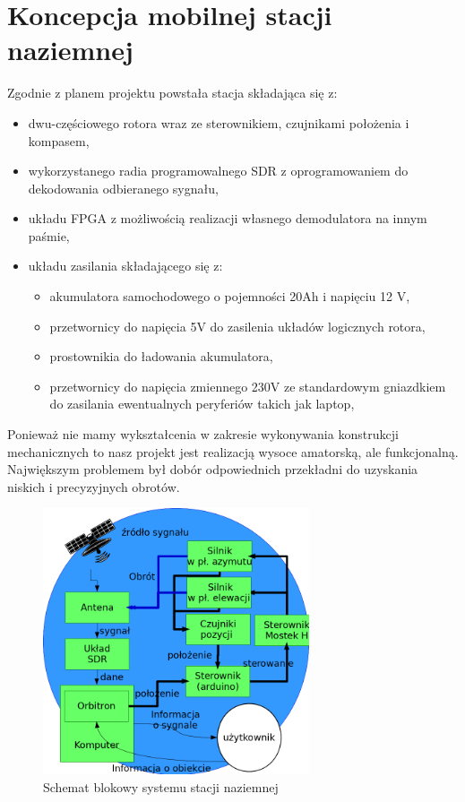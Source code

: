 \section{Koncepcja mobilnej stacji naziemnej}

Zgodnie z planem projektu powstała stacja składająca się z:

\begin{itemize}
 \item dwu-częściowego rotora wraz ze sterownikiem, czujnikami położenia i kompasem,
 \item wykorzystanego radia programowalnego SDR z oprogramowaniem do dekodowania odbieranego sygnału,
 \item układu FPGA z możliwością realizacji własnego demodulatora na innym paśmie,
 \item układu zasilania składającego się z: 
    \begin{itemize}
    \item akumulatora samochodowego o pojemności 20Ah i napięciu 12 V,
    \item przetwornicy do napięcia 5V do zasilenia układów logicznych rotora,
    \item prostownikia do ładowania akumulatora,
    \item przetwornicy do napięcia zmiennego 230V ze standardowym gniazdkiem do zasilania ewentualnych peryferiów takich jak laptop,
    \end{itemize}
\end{itemize}

Ponieważ nie mamy wykształcenia w zakresie wykonywania konstrukcji mechanicznych to nasz projekt jest realizacją wysoce amatorską, ale funkcjonalną. Największym problemem był dobór odpowiednich przekładni do uzyskania niskich i precyzyjnych obrotów.

\begin{figure}[!htbp]
    \centering
    \includegraphics[width=0.7\textwidth]{schemat_skik2017}
    \caption{Schemat blokowy systemu stacji naziemnej}
\end{figure}
